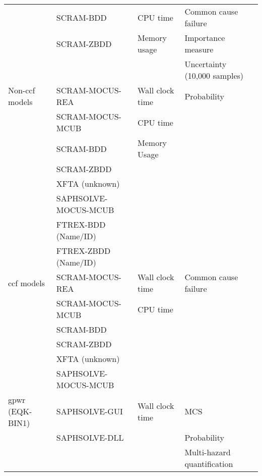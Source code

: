 \begin{longtable}{llll}
    & SCRAM-BDD & CPU time &  Common cause failure \\
    & SCRAM-ZBDD & Memory usage &  Importance measure \\
    & & & Uncertainty (10,000 samples) \\
\midrule
Non-\acrshort{ccf} models  & SCRAM-MOCUS-REA & Wall clock time & Probability \\
                & SCRAM-MOCUS-MCUB & CPU time & \\
                & SCRAM-BDD & Memory Usage & \\
                & SCRAM-ZBDD & & \\
                & XFTA (unknown) &  &  \\
                & SAPHSOLVE-MOCUS-MCUB &  &  \\
                & FTREX-BDD (Name/ID) &  &  \\
                & FTREX-ZBDD (Name/ID) &  & \\
\midrule
\acrshort{ccf} models  & SCRAM-MOCUS-REA & Wall clock time & Common cause failure \\
            & SCRAM-MOCUS-MCUB & CPU time & \\
            & SCRAM-BDD & & \\
            & SCRAM-ZBDD & & \\
            & XFTA (unknown) & &  \\
            & SAPHSOLVE-MOCUS-MCUB &  &  \\
\midrule
\acrshort{gpwr} (EQK-BIN1) & SAPHSOLVE-GUI & Wall clock time & MCS \\ 
                       & SAPHSOLVE-DLL & & Probability \\
                       & & & Multi-hazard quantification \\
\bottomrule
\end{longtable}